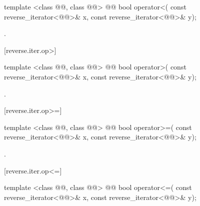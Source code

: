 %
\begin{itemdecl}
template <class @@, class @@>
    @@
  bool operator<(
    const reverse_iterator<@@>& x,
    const reverse_iterator<@@>& y);
\end{itemdecl}

\begin{itemdescr}
\pnum
\removed{\returns}
.
\end{itemdescr}

[reverse.iter.op>]{}

%
\begin{itemdecl}
template <class @@, class @@>
    @@
  bool operator>(
    const reverse_iterator<@@>& x,
    const reverse_iterator<@@>& y);
\end{itemdecl}

\begin{itemdescr}
\pnum
\removed{\returns}
.
\end{itemdescr}

[reverse.iter.op>=]{}

%
\begin{itemdecl}
template <class @@, class @@>
    @@
  bool operator>=(
    const reverse_iterator<@@>& x,
    const reverse_iterator<@@>& y);
\end{itemdecl}

\begin{itemdescr}
\pnum
\removed{\returns}
.
\end{itemdescr}

[reverse.iter.op<=]{}

%
\begin{itemdecl}
template <class @@, class @@>
    @@
  bool operator<=(
    const reverse_iterator<@@>& x,
    const reverse_iterator<@@>& y);
\end{itemdecl}

